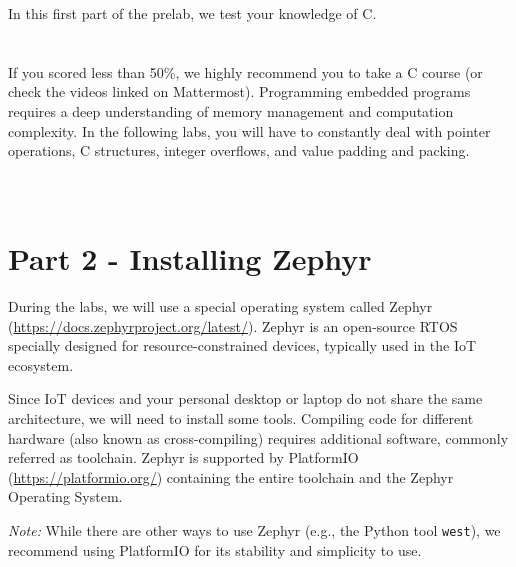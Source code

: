 \documentclass[11pt]{article}
\begin{document}
In this first part of the prelab, we test your knowledge of C.
\\
\\
\noindent{}\\

If you scored less than 50\%, we highly recommend you to take a C course (or check the videos linked on Mattermost).
Programming embedded programs requires a deep understanding of memory management and computation complexity.
In the following labs, you will have to constantly deal with pointer operations, C structures, integer overflows, and value padding and packing.
\\
\\
\noindent{}\\

\section*{Part 2 - Installing Zephyr}

During the labs, we will use a special operating system called Zephyr (\url{https://docs.zephyrproject.org/latest/}).
Zephyr is an open-source RTOS specially designed for resource-constrained devices, typically used in the IoT ecosystem.

Since IoT devices and your personal desktop or laptop do not share the same architecture, we will need to install some tools.
Compiling code for different hardware (also known as cross-compiling) requires additional software, commonly referred as toolchain.
Zephyr is supported by PlatformIO (\url{https://platformio.org/}) containing the entire toolchain and the Zephyr Operating System.

\textit{Note:}
While there are other ways to use Zephyr (e.g., the Python tool \texttt{west}), we recommend using PlatformIO for its stability and simplicity to use.\\
\\
\noindent{}\\
\end{document}
